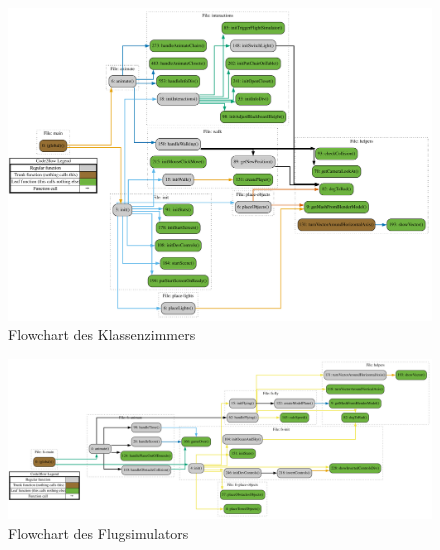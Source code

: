 \begin{figure}[H]
  \centering
  \includegraphics[width=1\textwidth]{images/flowchart/root.pdf}
  \caption{Flowchart des Klassenzimmers}
  \label{fig:FlowchartRoot}
\end{figure}\noindent
\begin{figure}[H]
  \centering
  \includegraphics[width=1\textwidth]{images/flowchart/flight-simulator.pdf}
  \caption{Flowchart des Flugsimulators}
  \label{fig:FlowchartFlightSim}
\end{figure}\noindent